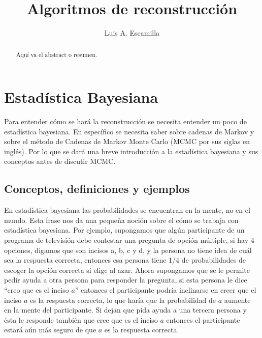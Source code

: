 \documentclass{article}
\title{Algoritmos de reconstrucci\'on}
\author{Luis A. Escamilla}
\begin{document}
\maketitle

  
    \maketitle
    \begin{abstract}
      Aqu\'i va el abstract o resumen.
    \end{abstract}









\section*{Estad\'istica Bayesiana}

Para entender c\'omo se har\'a la reconstrucci\'on se necesita entender un poco de estad\'istica bayesiana. En espec\'ifico se necesita saber sobre cadenas de Markov y sobre el m\'etodo de Cadenas de Markov Monte Carlo (MCMC por sus siglas en ingl\'es). Por lo que se dar\'a una breve introducci\'on a la estad\'istica bayesiana y sus conceptos antes de discutir MCMC.

\subsection*{Conceptos, definiciones y ejemplos}

En estad\'istica bayesiana las probabilidades se encuentran en la mente, no en el mundo. Esta frase nos da una peque\~na noci\'on sobre el c\'omo se trabaja con estad\'istica bayesiana. Por ejemplo, supongamos que alg\'un participante de un programa de televisi\'on debe contestar una pregunta de opci\'on m\'ultiple, si hay 4 opciones, digamos que son incisos a, b, c y d, y la persona no tiene idea de cu\'al sea la respuesta correcta, entonces esa persona tiene 1/4 de probabilidades de escoger la opci\'on correcta si elige al azar. Ahora supongamos que se le permite pedir ayuda a otra persona para responder la pregunta, si esta persona le dice ``creo que es el inciso $a$'' entonces el participante podr\'ia inclinarse en creer que el inciso $a$ es la respuesta correcta, lo que har\'ia que la probabilidad de $a$ aumente en la mente del participante. Si dejan que pida ayuda a una tercera persona y \'esta le responde tambi\'en que cree que es el inciso $a$ entonces el participante estar\'a a\'un m\'as seguro de que $a$ es la respuesta correcta. 
\end{document}
